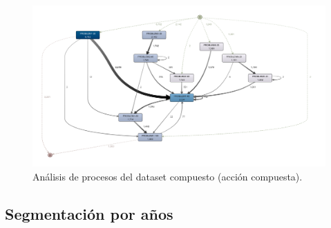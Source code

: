 \begin{figure}[H]
    \centering
    \includegraphics[width=1.25\textwidth]{imagenes/DISCO_compound/Dataset Fusionado - Compuesto.png}
    \caption{Análisis de procesos del dataset compuesto (acción compuesta).}
    \label{fig:datasetFusionadoCompuesto}
\end{figure}

\subsection{Segmentación por años}

